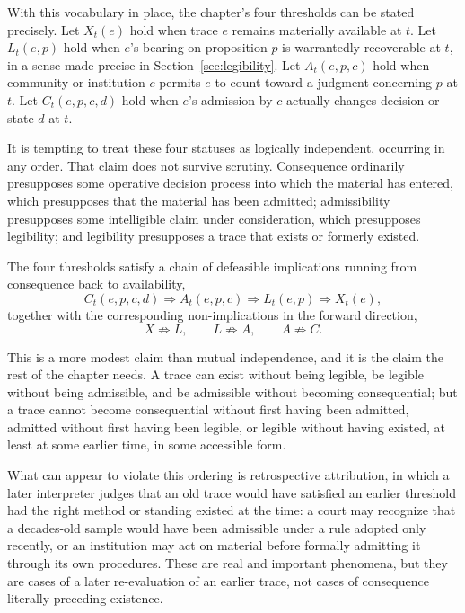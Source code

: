 With this vocabulary in place, the chapter's four thresholds can be stated precisely. Let $X_t(e)$ hold when trace $e$ remains materially available at $t$. Let $L_t(e,p)$ hold when $e$'s bearing on proposition $p$ is warrantedly recoverable at $t$, in a sense made precise in Section~\ref{sec:legibility}. Let $A_t(e,p,c)$ hold when community or institution $c$ permits $e$ to count toward a judgment concerning $p$ at $t$. Let $C_t(e,p,c,d)$ hold when $e$'s admission by $c$ actually changes decision or state $d$ at $t$.

It is tempting to treat these four statuses as logically independent, occurring in any order. That claim does not survive scrutiny. Consequence ordinarily presupposes some operative decision process into which the material has entered, which presupposes that the material has been admitted; admissibility presupposes some intelligible claim under consideration, which presupposes legibility; and legibility presupposes a trace that exists or formerly existed.

\begin{proposition}
\label{prop:dependency-chain}
The four thresholds satisfy a chain of defeasible implications running from consequence back to availability,
\[
C_t(e,p,c,d) \Rightarrow A_t(e,p,c) \Rightarrow L_t(e,p) \Rightarrow X_t(e),
\]
together with the corresponding non-implications in the forward direction,
\[
X \not\Rightarrow L, \qquad L \not\Rightarrow A, \qquad A \not\Rightarrow C.
\]
\end{proposition}

This is a more modest claim than mutual independence, and it is the claim the rest of the chapter needs. A trace can exist without being legible, be legible without being admissible, and be admissible without becoming consequential; but a trace cannot become consequential without first having been admitted, admitted without first having been legible, or legible without having existed, at least at some earlier time, in some accessible form.

What can appear to violate this ordering is retrospective attribution, in which a later interpreter judges that an old trace would have satisfied an earlier threshold had the right method or standing existed at the time: a court may recognize that a decades-old sample would have been admissible under a rule adopted only recently, or an institution may act on material before formally admitting it through its own procedures. These are real and important phenomena, but they are cases of a later re-evaluation of an earlier trace, not cases of consequence literally preceding existence.

